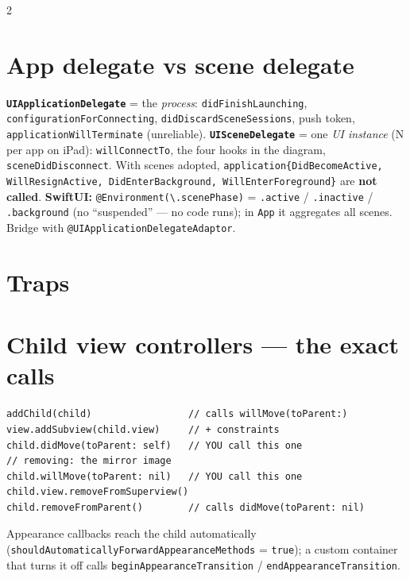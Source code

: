 \documentclass[8pt]{extarticle}
\begin{document}
\begin{multicols}{2}
\section{App delegate vs scene delegate}
\textbf{\texttt{UIApplicationDelegate}} = the \emph{process}: \texttt{didFinishLaunching},
\texttt{configurationForConnecting}, \texttt{didDiscardSceneSessions}, push token,
\texttt{applicationWillTerminate} (unreliable).
\textbf{\texttt{UISceneDelegate}} = one \emph{UI instance} (N per app on iPad):
\texttt{willConnectTo}, the four hooks in the diagram, \texttt{sceneDidDisconnect}. With
scenes adopted, \texttt{application\{DidBecomeActive, WillResignActive, DidEnterBackground,
WillEnterForeground\}} are \textbf{not called}.
\textbf{SwiftUI:} \texttt{@Environment(\textbackslash.scenePhase)} = \texttt{.active} /
\texttt{.inactive} / \texttt{.background} (no ``suspended'' — no code runs); in
\texttt{App} it aggregates all scenes. Bridge with \texttt{@UIApplicationDelegateAdaptor}.

\section{Traps}
\begin{itemize}
\end{itemize}

\section{Child view controllers — the exact calls}
\begin{lstlisting}[language=SwiftSheet]
addChild(child)                 // calls willMove(toParent:)
view.addSubview(child.view)     // + constraints
child.didMove(toParent: self)   // YOU call this one
// removing: the mirror image
child.willMove(toParent: nil)   // YOU call this one
child.view.removeFromSuperview()
child.removeFromParent()        // calls didMove(toParent: nil)
\end{lstlisting}
Appearance callbacks reach the child automatically
(\texttt{shouldAutomaticallyForwardAppearanceMethods} = \texttt{true}); a custom container
that turns it off calls \texttt{beginAppearanceTransition} / \texttt{endAppearanceTransition}.


\end{multicols}
\end{document}
